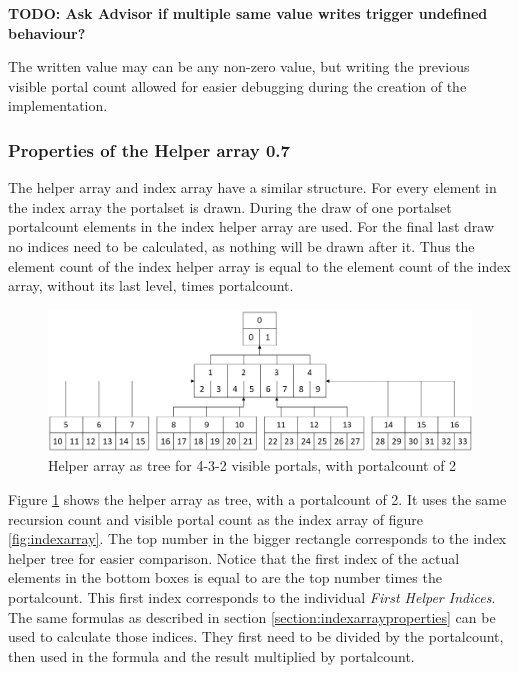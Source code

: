 \textbf{ \huge TODO: Ask Advisor if multiple same value writes trigger undefined behaviour? }%

The written value may can be any non-zero value, but writing the previous visible portal count allowed for easier debugging during the creation of the implementation.

\subsubsection{Properties of the Helper array 0.7}
\label{section:helperarrayproperties}
The helper array and index array have a similar structure. For every element in the index array the \gls{portalset} is drawn. During the draw of one \gls{portalset} \gls{portalcount} elements in the index helper array are used. For the final last draw no indices need to be calculated, as nothing will be drawn after it. Thus the element count of the index helper array is equal to the element count of the index array, without its last level, times \gls{portalcount}.

\begin{figure}[h]
	\includegraphics[width=\linewidth]{images/helperarray.png}
	\caption{Helper array as tree for 4-3-2 visible portals, with \gls{portalcount} of 2}
	\label{fig:helperarray}
\end{figure}

Figure \ref{fig:helperarray} shows the helper array as tree, with a \gls{portalcount} of 2. It uses the same recursion count and visible portal count as the index array of figure \ref{fig:indexarray}. The top number in the bigger rectangle corresponds to the index helper tree for easier comparison. Notice that the first index of the actual elements in the bottom boxes is equal to are the top number times the \gls{portalcount}. This first index corresponds to the individual \textit{First Helper Indices}. The same formulas as described in section \ref{section:indexarrayproperties} can be used to calculate those indices. They first need to be divided by the \gls{portalcount}, then used in the formula and the result multiplied by \gls{portalcount}.


